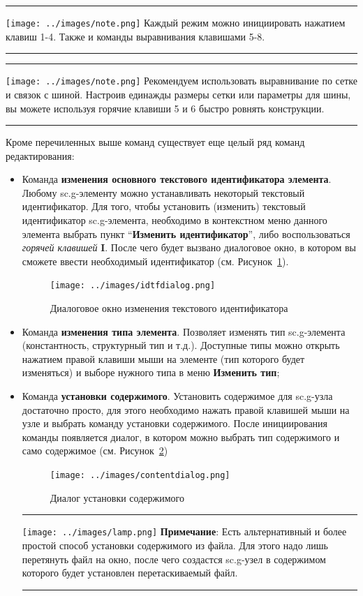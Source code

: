 \hrule
\smallskip
\noindent\texttt{[image: ../images/note.png]} \textcolor[rgb]{.67,.05,.05}{Каждый режим можно инициировать нажатием клавиш 1-4. Также и команды выравнивания клавишами 5-8.}
\smallskip
\hrule
\smallskip
\hrule
\smallskip
\noindent\texttt{[image: ../images/note.png]} \textcolor[rgb]{.67,.05,.05}{Рекомендуем использовать выравнивание по сетке и связок с шиной. Настроив единажды размеры сетки или параметры для шины, вы можете используя горячие клавиши 5 и 6 быстро ровнять конструкции.}
\smallskip
\hrule
\medskip
Кроме перечиленных выше команд существует еще целый ряд команд редактирования:
\begin{itemize}
	\item Команда \textbf{изменения основного текстового идентификатора элемента}. Любому sc.g-элементу можно устанавливать некоторый текстовый идентификатор. Для того, чтобы установить (изменить) текстовый идентификатор sc.g-элемента, необходимо в контекстном меню данного элемента выбрать пункт “\textbf{Изменить идентификатор}”, либо воспользоваться \textit{горячей клавишей} \textbf{I}. После чего будет вызвано диалоговое окно, в котором вы сможете ввести необходимый идентификатор (см. Рисунок~\ref{idtfdialog}).
	\begin{figure}[h]
		\centering\texttt{[image: ../images/idtfdialog.png]}
		\caption{Диалоговое окно изменения текстового идентификатора}
		\label{idtfdialog}
	\end{figure}
	\item Команда \textbf{изменения типа элемента}. Позволяет изменять тип sc.g-элемента (константность, структурный тип и т.д.). Доступные типы можно открыть нажатием правой клавиши мыши на элементе (тип которого будет изменяться) и выборе нужного типа в меню \textbf{Изменить тип};
	\item Команда \textbf{установки содержимого}. Установить содержимое для sc.g-узла достаточно просто, для этого необходимо  нажать правой клавишей мыши на узле и выбрать команду установки содержимого. После инициирования команды появляется диалог, в котором можно выбрать тип содержимого и само содержимое (см. Рисунок~\ref{contentdialog})
	\begin{figure}[h]
		\centering\texttt{[image: ../images/contentdialog.png]}
		\caption{Диалог установки содержимого}
		\label{contentdialog}
	\end{figure}
	\hrule
\smallskip
\noindent\texttt{[image: ../images/lamp.png]} \textcolor[rgb]{.25, .67, .2}{\textbf{Примечание}: Есть альтернативный и более простой способ установки содержимого из файла. Для этого надо лишь перетянуть файл на окно, после чего создастся sc.g-узел в содержимом которого будет установлен перетаскиваемый файл.}
\smallskip
\hrule
\end{itemize}
